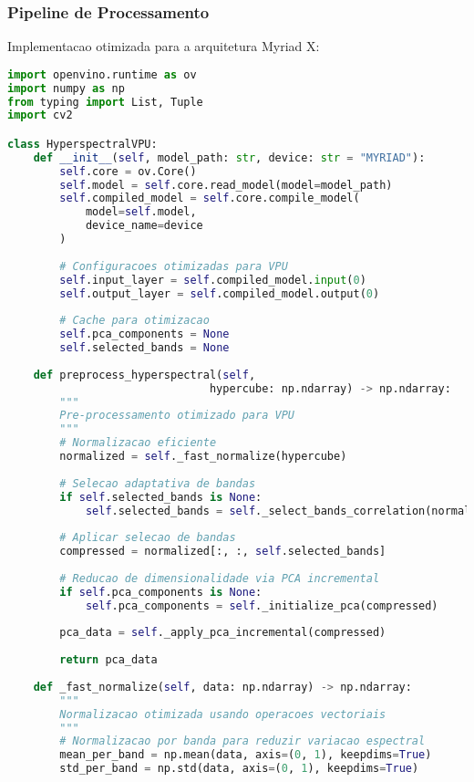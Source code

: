 \subsubsection{Pipeline de Processamento}
Implementacao otimizada para a arquitetura Myriad X:

\begin{lstlisting}[language=Python]
import openvino.runtime as ov
import numpy as np
from typing import List, Tuple
import cv2

class HyperspectralVPU:
    def __init__(self, model_path: str, device: str = "MYRIAD"):
        self.core = ov.Core()
        self.model = self.core.read_model(model=model_path)
        self.compiled_model = self.core.compile_model(
            model=self.model, 
            device_name=device
        )
        
        # Configuracoes otimizadas para VPU
        self.input_layer = self.compiled_model.input(0)
        self.output_layer = self.compiled_model.output(0)
        
        # Cache para otimizacao
        self.pca_components = None
        self.selected_bands = None
        
    def preprocess_hyperspectral(self, 
                               hypercube: np.ndarray) -> np.ndarray:
        """
        Pre-processamento otimizado para VPU
        """
        # Normalizacao eficiente
        normalized = self._fast_normalize(hypercube)
        
        # Selecao adaptativa de bandas
        if self.selected_bands is None:
            self.selected_bands = self._select_bands_correlation(normalized)
        
        # Aplicar selecao de bandas
        compressed = normalized[:, :, self.selected_bands]
        
        # Reducao de dimensionalidade via PCA incremental
        if self.pca_components is None:
            self.pca_components = self._initialize_pca(compressed)
        
        pca_data = self._apply_pca_incremental(compressed)
        
        return pca_data
    
    def _fast_normalize(self, data: np.ndarray) -> np.ndarray:
        """
        Normalizacao otimizada usando operacoes vectoriais
        """
        # Normalizacao por banda para reduzir variacao espectral
        mean_per_band = np.mean(data, axis=(0, 1), keepdims=True)
        std_per_band = np.std(data, axis=(0, 1), keepdims=True)
        

\end{lstlisting}

